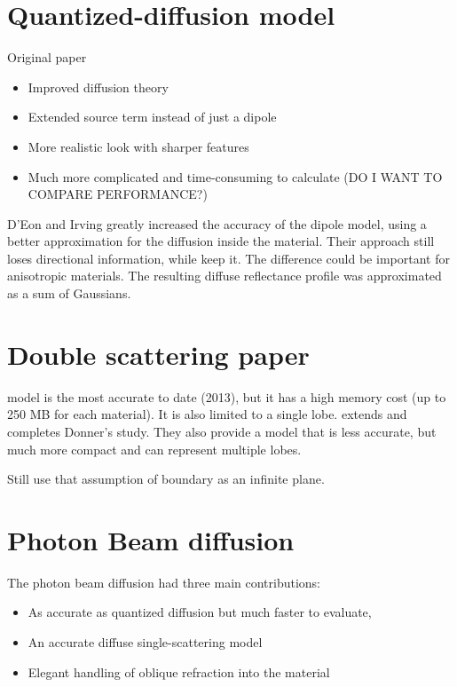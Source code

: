 \section{Quantized-diffusion model}
Original paper \cite{D'Eon:2011:QMR:1964921.1964951}
\begin{itemize}
    \item Improved diffusion theory
    \item Extended source term instead of just a dipole
    \item More realistic look with sharper features
    \item Much more complicated and time-consuming to calculate (DO I WANT TO COMPARE PERFORMANCE?)
\end{itemize}
D’Eon and Irving  greatly increased the accuracy of the dipole model, using a
better approximation for the diffusion inside the material. Their approach still
loses directional information, while \cite{holzschuch:hal-00760054} keep it. The
difference could be important for anisotropic materials.
The resulting diffuse reflectance profile was approximated as a sum of Gaussians.

\section{Double scattering paper}
\cite{Donner:2009:EBM} model is the most accurate to date (2013), but it has a
high memory cost (up to 250 MB for each material). It is also limited to a
single lobe. \cite{holzschuch:hal-00760054} extends and completes Donner's
study. They also provide a model that is less accurate, but much more compact
and can represent multiple lobes.

Still use that assumption of boundary as an infinite plane.

\section{Photon Beam diffusion}
The photon beam diffusion \cite{Habel:2013:PBD:2600890.2600896} had three main
contributions:
\begin{itemize}
    \item As accurate as quantized diffusion but much faster to evaluate,
    \item An accurate diffuse single-scattering model
    \item Elegant handling of oblique refraction into the material
\end{itemize}


